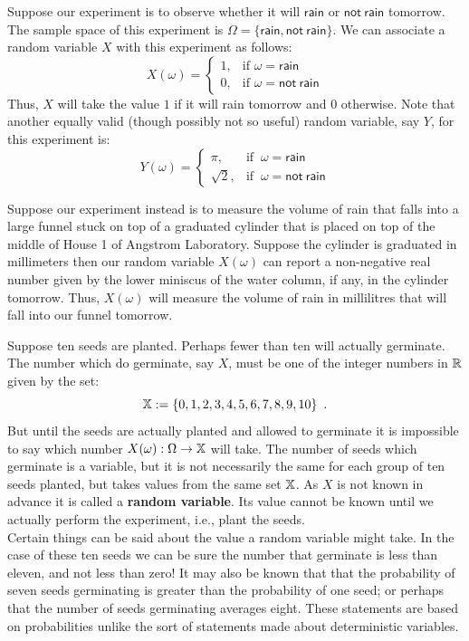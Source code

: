 \begin{example}\label{Exmp:RainOrShine}
Suppose our experiment is to observe whether it will $\mathsf{rain}$ or $\mathsf{not~rain}$ tomorrow. 
The sample space of this experiment is $\Omega= \{ \mathsf{rain},\mathsf{not~rain} \}$. 
We can associate a random variable $X$ with this experiment as follows:
\[X(\omega)=
\begin{cases}
1, & \text{if } \omega = \mathsf{rain}\\
0, &  \text{if } \omega = \mathsf{not~rain}
\end{cases}
\]
Thus, $X$ will take the value $1$ if it will rain tomorrow and $0$ otherwise.  
Note that another equally valid (though possibly not so useful) random variable, say $Y$, for this experiment is:
\[Y(\omega)=
\begin{cases}
\pi, & \text{if } \ \omega = \mathsf{rain}\\
\sqrt{2}, &  \text{if } \ \omega = \mathsf{not~rain}
\end{cases}
\]
\end{example}

\begin{example}\label{Exmp:RainInmms}
Suppose our experiment instead is to measure the volume of rain that falls into a large funnel stuck on top of a graduated cylinder that is placed on top of the middle of House 1 of Angstrom Laboratory. 
Suppose the cylinder is graduated in millimeters then our random variable $X(\omega)$ can report a non-negative real number given by the lower miniscus of the water column, if any, in the cylinder tomorrow.  
Thus, $X(\omega)$ will measure the volume of rain in millilitres that will fall into our funnel tomorrow. 
\end{example}

\begin{example}\label{Exmp:SeedPlanting}
Suppose ten seeds are planted. Perhaps fewer than ten will actually germinate. 
The number which do germinate, say $X$, must be one of the integer numbers in $\mathbb{R}$ given by the set:
\[ \mathbb{X} := \{0,1,2,3,4,5,6,7,8,9,10\} \enspace .\]
But until the seeds are actually planted and allowed to germinate it is
impossible to say which number $X(\omega): \Omega \to \mathbb{X}$ will take. 
The number of seeds which germinate is a variable, but it is not necessarily the same for each group of ten
seeds planted, but takes values from the same set $\mathbb{X}$.  
As $X$ is not known in advance it is called a {\bf random variable}. 
Its value cannot be known until we actually perform the experiment, i.e.,
plant the seeds.\\[6pt]Certain things can be said about the value a
random variable might take. In the case of these ten seeds we can be
sure the number that germinate  is less than eleven, and not less than
zero! It may also be known that that the probability of seven seeds
germinating is greater than the probability of one seed; or perhaps that
the number of seeds germinating averages eight. These statements are
based on probabilities unlike the sort of statements made about
deterministic variables.
\end{example}

